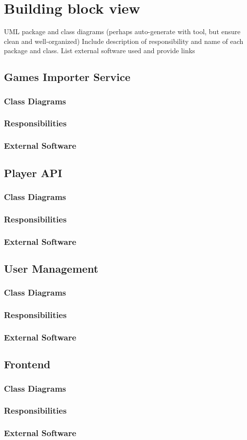 \section{Building block view}
UML package and class diagrams (perhaps auto-generate with tool, but ensure clean and well-organized)
Include description of responsibility and name of each package and class.
List external software used and provide links


\subsection{Games Importer Service}
\subsubsection{Class Diagrams}
\subsubsection{Responsibilities}
\subsubsection{External Software}
\subsection{Player API}
\subsubsection{Class Diagrams}
\subsubsection{Responsibilities}
\subsubsection{External Software}
\subsection{User Management}
\subsubsection{Class Diagrams}
\subsubsection{Responsibilities}
\subsubsection{External Software}
\subsection{Frontend}
\subsubsection{Class Diagrams}
\subsubsection{Responsibilities}
\subsubsection{External Software}